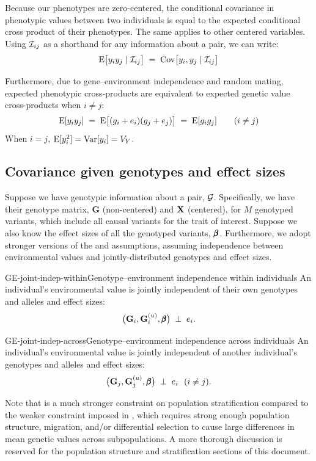 \documentclass[12pt]{article}
\numberwithin{equation}{section}
\begin{document}
Because our phenotypes are zero-centered, the conditional covariance in phenotypic values between two individuals is equal to the expected conditional cross product of their phenotypes.
The same applies to other centered variables.
Using $\mathcal{I}_{ij}$ as a shorthand for any information about a pair, we can write:
$$ \mathrm{E}\big[y_i y_j \mid \mathcal{I}_{ij}\big] \;=\; \mathrm{Cov}\big[y_i, y_j \mid \mathcal{I}_{ij}\big] $$

Furthermore, due to gene--environment independence and random mating, expected phenotypic cross-products are equivalent to expected genetic value cross-products when $i \neq j$:
$$ \mathrm{E}[y_i y_j] \;=\; \mathrm{E}\big[(g_i + e_i)(g_j + e_j)\big] \;=\; \mathrm{E}[g_i g_j] \qquad (i \neq j) $$
When $i = j$, $\mathrm{E}[y_i^2] = \mathrm{Var}[y_i] = V_Y$.

\subsection{Covariance given genotypes and effect sizes}\label{sec:rm-cov-geno-effects}

Suppose we have genotypic information about a pair, $\mathcal{G}$.
Specifically, we have their genotype matrix, $\mathbf{G}$ (non-centered) and $\mathbf{X}$ (centered), for $M$ genotyped variants, which include all causal variants for the trait of interest.
Suppose we also know the effect sizes of all the genotyped variants, $\pmb{\beta}$.
Furthermore, we adopt stronger versions of the  and  assumptions, assuming independence between environmental values and jointly-distributed genotypes and effect sizes.

\begin{assumption}{GE-joint-indep-within}{Genotype--environment independence within individuals}
An individual's environmental value is jointly independent of their own genotypes and alleles and effect sizes:
$$ \big(\mathbf{G}_i, \mathbf{G}^{(u)}_i, \pmb{\beta}\big) \;\perp\; e_i . $$
\end{assumption}

\begin{assumption}{GE-joint-indep-across}{Genotype--environment independence across individuals}
An individual's environmental value is jointly independent of another individual's genotypes and alleles and effect sizes:
$$ \big(\mathbf{G}_j, \mathbf{G}^{(u)}_j, \pmb{\beta}\big) \;\perp\; e_i \ \ (i \neq j) . $$
\end{assumption}
Note that  is a much stronger constraint on population stratification compared to the weaker constraint imposed in , which requires strong enough population structure, migration, and/or differential selection to cause large differences in mean genetic values across subpopulations.
A more thorough discussion is reserved for the population structure and stratification sections of this document.
\end{document}
